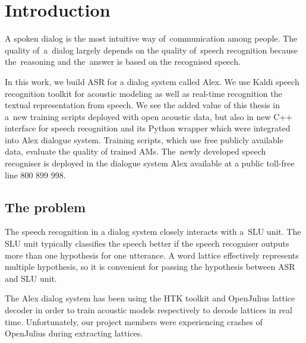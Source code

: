 \chapter{Introduction}
\label{cha:intro}

A spoken dialog is the most intuitive way of~communication among people. 
The quality of~a~dialog largely depends on the quality of~speech recognition because the~reasoning and the~answer is based on the recognised speech. 

In this work, we build \acl{ASR} for a dialog system called Alex. 
We use Kaldi speech recognition toolkit\cite{povey2011kaldi} for acoustic modeling as well as real-time recognition the textual representation from speech.
We see the added value of this thesis in a~new training scripts deployed with open acoustic data\cite{korvas_2014}, but also in new C++ interface for speech recognition and its Python wrapper which were integrated into Alex dialogue system. 
Training scripts, which use free publicly available data, evaluate the quality of trained \aclp{AM}.
The~newly developed speech recogniser is deployed in the dialogue system Alex available at a public toll-free line 800 899 998. 


\section{The problem} 
\label{sec:problem}

The speech recognition in a dialog system closely interacts with a~\acl{SLU} unit.
The \ac{SLU} unit typically classifies the speech better if the speech recogniser outputs more than one hypothesis for one utterance. 
A word lattice effectively represents multiple hypothesis, so it is convenient for passing the hypothesis between \ac{ASR} and \ac{SLU} unit.

The Alex dialog system has been using the \ac{HTK} toolkit\cite{young94htk} and OpenJulius\cite{lee2009julius} lattice decoder in order to train acoustic models respectively to decode lattices in real time. 
Unfortunately, our project members were experiencing crashes of OpenJulius during extracting lattices.

